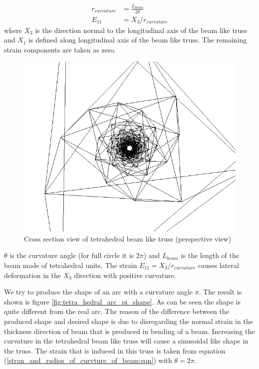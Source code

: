 \begin{equation}
\begin{aligned}
r_{curvature}&=\frac{ L_{beam} }{2 \theta}\\
E_{11}&=X_3/r_{curvature}
\end{aligned}
\label{stran_and_radios_of_curvture_of_beam:eqn}
\end{equation}
where $X_3$ is the direction normal to the longitudinal axis of the beam like truss and $X_1$ is defined along longitudinal axis of the beam like truss. The remaining strain components are taken as zero.
\begin{figure} 
\centering
\includegraphics[width=6.0in]{./chap_5_active_trusses/images_linear_tetrahedral/refrence_shap_100_tetra_unit_tetrahedral_unit_cross_section_view.png}
\caption{Cross section view of tetrahedral beam like truss (perspective view)}
\label{fig:refrence_shap_100_tetra_unit_tetrahedral_unit_cross_section_view}
\end{figure}
$\theta$ is the curvature angle (for full circle it is $2\pi$) and
$ L_{beam}$ is the length of the beam made of tetrahedral units.
The strain $E_{11}=X_3/r_{curvature}$ causes lateral deformation in the $X_3$ direction with positive curvature.

We try to produce the shape of an arc with a curvature angle $\pi$. The result is shown is figure \ref{fig:tetra_hedral_arc_pi_shape}. As can be seen the shape is quite different from the real arc. The reason of the difference between the produced shape and desired shape is due to disregarding the normal strain in the thickness direction of beam that is produced in bending of a beam. Increasing the curvature in the tetrahedral beam like truss will cause a sinusoidal like shape in the truss. The strain that is induced in this truss is taken from equation (\ref{stran_and_radios_of_curvture_of_beam:eqn}) with $\theta=2 \pi$.

